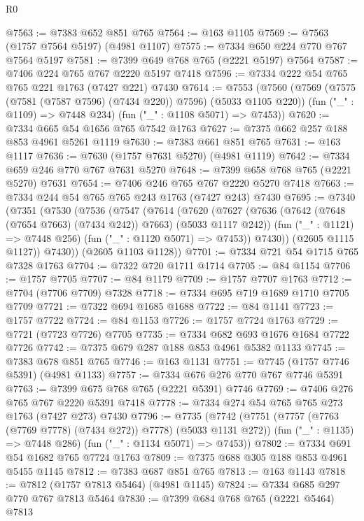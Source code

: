 \begin{lexlean}{R0}
\begin{coremodule}
{{{{{@7563 := @7383 @652 @851 @765
@7564 := @163 @1105
@7569 := @7563 (@1757 @7564 @5197) (@4981 @1107)
@7575 := @7334 @650 @224 @770 @767 @7564 @5197
@7581 := @7399 @649 @768 @765 (@2221 @5197) @7564
@7587 := @7406 @224 @765 @767 @2220 @5197 @7418
@7596 := @7334 @222 @54 @765 @765 @221 @1763 (@7427 @221) @7430
@7614 := @7553
    (@7560
      (@7569 (@7575 (@7581 (@7587 @7596) (@7434 @220)) @7596) (@5033 @1105 @220))
      (fun ("_" : @1109) => @7448 @234)
      (fun ("_" : @1108 @5071) => @7453))
@7620 := @7334 @665 @54 @1656 @765 @7542 @1763
@7627 := @7375 @662 @257 @188 @853 @4961 @5261 @1119
@7630 := @7383 @661 @851 @765
@7631 := @163 @1117
@7636 := @7630 (@1757 @7631 @5270) (@4981 @1119)
@7642 := @7334 @659 @246 @770 @767 @7631 @5270
@7648 := @7399 @658 @768 @765 (@2221 @5270) @7631
@7654 := @7406 @246 @765 @767 @2220 @5270 @7418
@7663 := @7334 @244 @54 @765 @765 @243 @1763 (@7427 @243) @7430
@7695 := @7340
    (@7351
      (@7530
        (@7536
          (@7547
            (@7614
              (@7620
                (@7627
                  (@7636 (@7642 (@7648 (@7654 @7663) (@7434 @242)) @7663) (@5033 @1117 @242))
                  (fun ("_" : @1121) => @7448 @256)
                  (fun ("_" : @1120 @5071) => @7453))
                @7430))
            (@2605 @1115 @1127))
          @7430))
      (@2605 @1103 @1128))
@7701 := @7334 @721 @54 @1715 @765 @7328 @1763
@7704 := @7322 @720 @1711 @1714
@7705 := @84 @1154
@7706 := @1757 @7705
@7707 := @84 @1179
@7709 := @1757 @7707 @1763
@7712 := @7704 (@7706 @7709) @7328
@7718 := @7334 @695 @719 @1689 @1710 @7705 @7709
@7721 := @7322 @694 @1685 @1688
@7722 := @84 @1141
@7723 := @1757 @7722
@7724 := @84 @1153
@7726 := @1757 @7724 @1763
@7729 := @7721 (@7723 @7726) @7705
@7735 := @7334 @682 @693 @1676 @1684 @7722 @7726
@7742 := @7375 @679 @287 @188 @853 @4961 @5382 @1133
@7745 := @7383 @678 @851 @765
@7746 := @163 @1131
@7751 := @7745 (@1757 @7746 @5391) (@4981 @1133)
@7757 := @7334 @676 @276 @770 @767 @7746 @5391
@7763 := @7399 @675 @768 @765 (@2221 @5391) @7746
@7769 := @7406 @276 @765 @767 @2220 @5391 @7418
@7778 := @7334 @274 @54 @765 @765 @273 @1763 (@7427 @273) @7430
@7796 := @7735
    (@7742
      (@7751 (@7757 (@7763 (@7769 @7778) (@7434 @272)) @7778) (@5033 @1131 @272))
      (fun ("_" : @1135) => @7448 @286)
      (fun ("_" : @1134 @5071) => @7453))
@7802 := @7334 @691 @54 @1682 @765 @7724 @1763
@7809 := @7375 @688 @305 @188 @853 @4961 @5455 @1145
@7812 := @7383 @687 @851 @765
@7813 := @163 @1143
@7818 := @7812 (@1757 @7813 @5464) (@4981 @1145)
@7824 := @7334 @685 @297 @770 @767 @7813 @5464
@7830 := @7399 @684 @768 @765 (@2221 @5464) @7813
}}}}}
\end{coremodule}
\end{lexlean}
